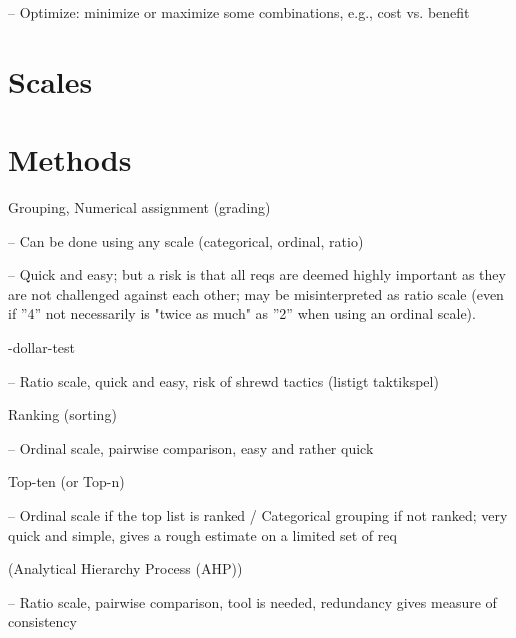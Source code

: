 -- Optimize: minimize or maximize some combinations, e.g., cost vs. benefit

\section{Scales}

\section{Methods}

\textbullet Grouping, Numerical assignment (grading)

-- Can be done using any scale (categorical, ordinal, ratio)

-- Quick and easy; but a risk is that all reqs are deemed highly important as they are
not challenged against each other; may be misinterpreted as ratio scale (even if
”4” not necessarily is "twice as much" as ”2” when using an ordinal scale).

-dollar-test

-- Ratio scale, quick and easy, risk of shrewd tactics (listigt taktikspel)

\textbullet Ranking (sorting)

-- Ordinal scale, pairwise comparison, easy and rather quick

\textbullet Top-ten (or Top-n)

-- Ordinal scale if the top list is ranked / Categorical grouping if not ranked; very
quick and simple, gives a rough estimate on a limited set of req

\textbullet (Analytical Hierarchy Process (AHP))

-- Ratio scale, pairwise comparison, tool is needed, redundancy gives measure of
consistency 
